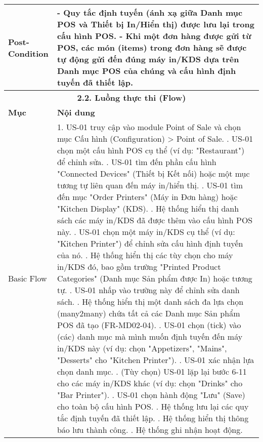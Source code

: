 \begin{longtable}{|m{4cm}|p{11cm}|}
\hline
Post-Condition & - Quy tắc định tuyến (ánh xạ giữa Danh mục POS và Thiết bị In/Hiển thị) được lưu lại trong cấu hình POS. \newline - Khi một đơn hàng được gửi từ POS, các món (items) trong đơn hàng sẽ được tự động gửi đến đúng máy in/KDS dựa trên Danh mục POS của chúng và cấu hình định tuyến đã thiết lập. \\
\hline
\multicolumn{2}{|c|}{\textbf{2.2. Luồng thực thi (Flow)}} \\
\hline
\textbf{Mục} & \textbf{Nội dung} \\
\hline
Basic Flow & 1. US-01 truy cập vào module Point of Sale và chọn mục Cấu hình (Configuration) > Point of Sale. \newline 2. US-01 chọn một cấu hình POS cụ thể (ví dụ: "Restaurant") để chỉnh sửa. \newline 3. US-01 tìm đến phần cấu hình "Connected Devices" (Thiết bị Kết nối) hoặc một mục tương tự liên quan đến máy in/hiển thị. \newline 4. US-01 tìm đến mục "Order Printers" (Máy in Đơn hàng) hoặc "Kitchen Display" (KDS). \newline 5. Hệ thống hiển thị danh sách các máy in/KDS đã được thêm vào cấu hình POS này. \newline 6. US-01 chọn một máy in/KDS cụ thể (ví dụ: "Kitchen Printer") để chỉnh sửa cấu hình định tuyến của nó. \newline 7. Hệ thống hiển thị các tùy chọn cho máy in/KDS đó, bao gồm trường "Printed Product Categories" (Danh mục Sản phẩm được In) hoặc tương tự. \newline 8. US-01 nhấp vào trường này để chỉnh sửa danh sách. \newline 9. Hệ thống hiển thị một danh sách đa lựa chọn (many2many) chứa tất cả các Danh mục Sản phẩm POS đã tạo (FR-MD02-04). \newline 10. US-01 chọn (tick) vào (các) danh mục mà mình muốn định tuyến đến máy in/KDS này (ví dụ: chọn "Appetizers", "Mains", "Desserts" cho "Kitchen Printer"). \newline 11. US-01 xác nhận lựa chọn danh mục. \newline 12. (Tùy chọn) US-01 lặp lại bước 6-11 cho các máy in/KDS khác (ví dụ: chọn "Drinks" cho "Bar Printer"). \newline 13. US-01 chọn hành động "Lưu" (Save) cho toàn bộ cấu hình POS. \newline 14. Hệ thống lưu lại các quy tắc định tuyến đã thiết lập. \newline 15. Hệ thống hiển thị thông báo lưu thành công. \newline 16. Hệ thống ghi nhận hoạt động. \\

\end{longtable}
